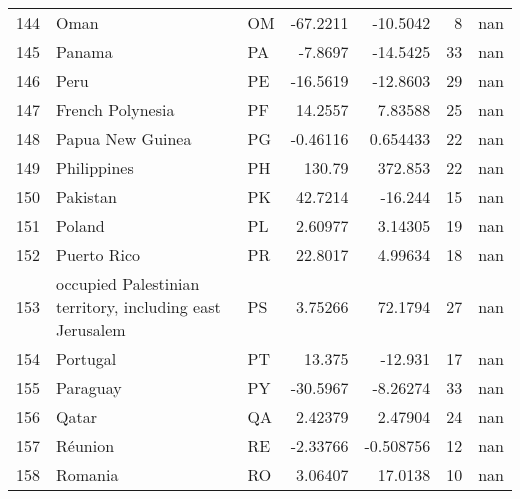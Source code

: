 \begin{tabular}{rllrrrr}
 144 & Oman                                                     & OM         &  -67.2211     &   -10.5042    &      8 &          nan \\
 145 & Panama                                                   & PA         &   -7.8697     &   -14.5425    &     33 &          nan \\
 146 & Peru                                                     & PE         &  -16.5619     &   -12.8603    &     29 &          nan \\
 147 & French Polynesia                                         & PF         &   14.2557     &     7.83588   &     25 &          nan \\
 148 & Papua New Guinea                                         & PG         &   -0.46116    &     0.654433  &     22 &          nan \\
 149 & Philippines                                              & PH         &  130.79       &   372.853     &     22 &          nan \\
 150 & Pakistan                                                 & PK         &   42.7214     &   -16.244     &     15 &          nan \\
 151 & Poland                                                   & PL         &    2.60977    &     3.14305   &     19 &          nan \\
 152 & Puerto Rico                                              & PR         &   22.8017     &     4.99634   &     18 &          nan \\
 153 & occupied Palestinian territory, including east Jerusalem & PS         &    3.75266    &    72.1794    &     27 &          nan \\
 154 & Portugal                                                 & PT         &   13.375      &   -12.931     &     17 &          nan \\
 155 & Paraguay                                                 & PY         &  -30.5967     &    -8.26274   &     33 &          nan \\
 156 & Qatar                                                    & QA         &    2.42379    &     2.47904   &     24 &          nan \\
 157 & Réunion                                                  & RE         &   -2.33766    &    -0.508756  &     12 &          nan \\
 158 & Romania                                                  & RO         &    3.06407    &    17.0138    &     10 &          nan \\

\end{tabular}
